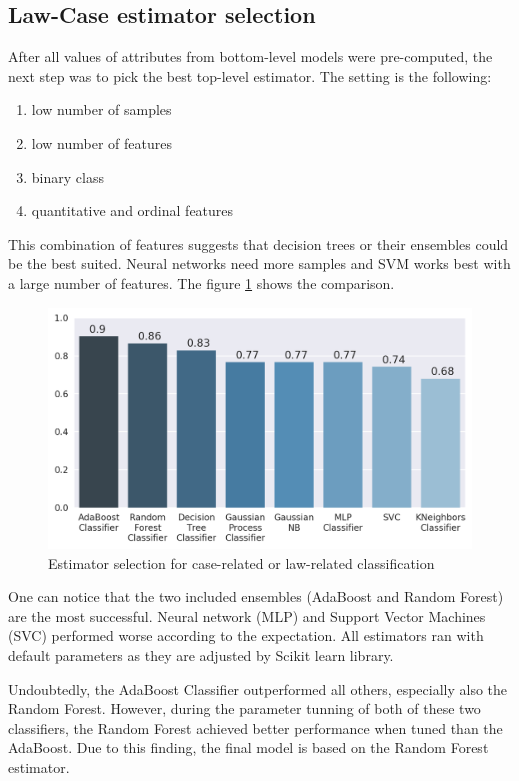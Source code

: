\documentclass[
  digital, %
  notable,   %
  nolof,     %
  nolot,     %
  draft
]{fithesis3}
\begin{document}
\subsection{Law-Case estimator selection}
\label{eval:law-case-model-selection}
After all values of attributes from bottom-level models were pre-computed, the next step was to pick the best top-level estimator.
The setting is the following:
\begin{enumerate}
\item low number of samples
\item low number of features
\item binary class
\item quantitative and ordinal features
\end{enumerate}
This combination of features suggests that decision trees or their ensembles could be the best suited.
Neural networks need more samples and SVM works best with a large number of features.
The figure \ref{fig:eval_law-case-model-selection} shows the comparison.

\begin{figure}[h]
\caption{Estimator selection for case-related or law-related classification}
\label{fig:eval_law-case-model-selection}
\includegraphics[width=\textwidth]{img/eval_law-case-model-selection}
\end{figure}

One can notice that the two included ensembles (AdaBoost and Random Forest) are the most successful.
Neural network (MLP) and Support Vector Machines (SVC) performed worse according to the expectation.
All estimators ran with default parameters as they are adjusted by Scikit learn library.

Undoubtedly, the AdaBoost Classifier outperformed all others, especially also the Random Forest.
However, during the parameter tunning of both of these two classifiers, the Random Forest achieved better performance when tuned than the AdaBoost.
Due to this finding, the final model is based on the Random Forest estimator.
\end{document}
